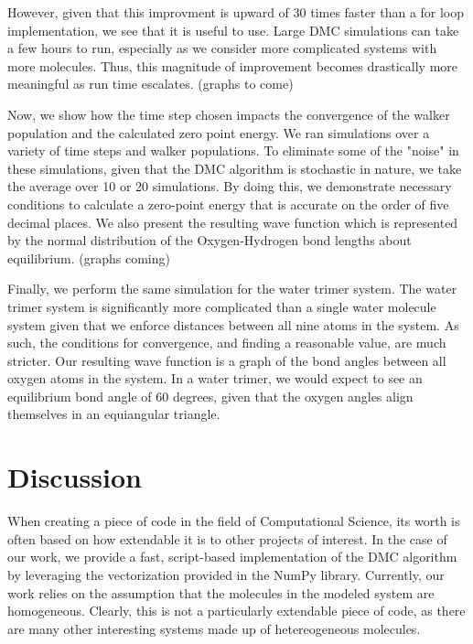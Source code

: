 \documentclass[journal=jacsat,manuscript=article]{achemso}
\begin{document}
However, given that this improvment is upward of 30 times faster than a for loop implementation, we see that it is useful to use. Large DMC simulations can take a few hours to run, especially as we consider more complicated systems with more molecules. Thus, this magnitude of improvement becomes drastically more meaningful as run time escalates. (graphs to come)

Now, we show how the time step chosen impacts the convergence of the walker population and the calculated zero point energy. We ran simulations over a variety of time steps and walker populations. To eliminate some of the "noise" in these simulations, given that the DMC algorithm is stochastic in nature, we take the average over 10 or 20 simulations. By doing this, we demonstrate necessary conditions to calculate a zero-point energy that is accurate on the order of five decimal places. We also present the resulting wave function which is represented by the normal distribution of the Oxygen-Hydrogen bond lengths about equilibrium. (graphs coming)

Finally, we perform the same simulation for the water trimer system. The water trimer system is significantly more complicated than a single water molecule system given that we enforce distances between all nine atoms in the system. As such, the conditions for convergence, and finding a reasonable value, are much stricter. Our resulting wave function is a graph of the bond angles between all oxygen atoms in the system. In a water trimer, we would expect to see an equilibrium bond angle of 60 degrees, given that the oxygen angles align themselves in an equiangular triangle. 

\section{Discussion}
When creating a piece of code in the field of Computational Science, its worth is often based on how extendable it is to other projects of interest. In the case of our work, we provide a fast, script-based implementation of the DMC algorithm by leveraging the vectorization provided in the NumPy library. Currently, our work relies on the assumption that the molecules in the modeled system are homogeneous. Clearly, this is not a particularly extendable piece of code, as there are many other interesting systems made up of hetereogeneous molecules. 
\end{document}
